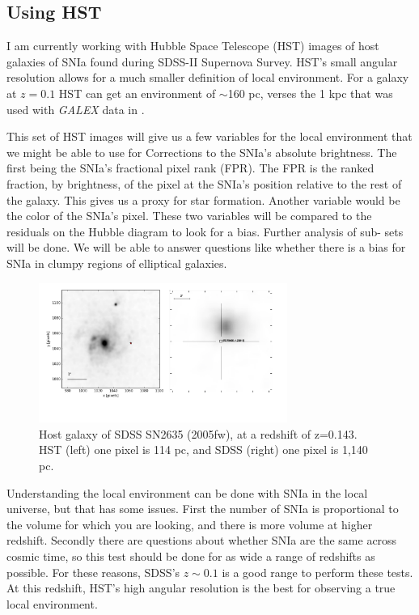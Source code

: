 \documentclass[apj, iop]{emulateapj}
\newcommand{\sn}{SNIa}
\begin{document}
\subsection{Using HST}\label{using-hst}

I am currently working with Hubble Space Telescope (HST) images of host galaxies
of \sn{} found during SDSS-II Supernova Survey. HST's small angular resolution
allows for a much smaller definition of local environment. For a galaxy at $z =
0.1$ HST can get an environment of $\sim$160 pc, verses the 1 kpc that was used 
with {\it GALEX} data in \cite{Jones15,Rigault15}.

This set of HST images will give us a few variables for the local environment
that we might be able to use for Corrections to the SNIa's absolute brightness.
The first being the SNIa's fractional pixel rank (FPR). The FPR is the ranked
fraction, by brightness, of the pixel at the SNIa's position relative to the
rest of the galaxy. This gives us a proxy for star formation. Another variable
would be the color of the SNIa's pixel. These two variables will be compared to
the residuals on the Hubble diagram to look for a bias. Further analysis of sub-
sets will be done. We will be able to answer questions like whether there is a
bias for \sn{} in clumpy regions of elliptical galaxies.

\begin{figure}
	\includegraphics[width=3.2in]{SN2635-combined-inverted.pdf}
	\caption{Host galaxy of SDSS SN2635 (2005fw), at a redshift of z=0.143. HST 
	(left) one pixel is 114 pc, and SDSS (right) one pixel is 1,140 pc.}
	\label{f:galaxy-compare}
\end{figure}

Understanding the local environment can be done with \sn{} in the local universe,
but that has some issues. First the number of \sn{} is proportional to the volume
for which you are looking, and there is more volume at higher redshift. Secondly
there are questions about whether \sn{} are the same across cosmic time, so this
test should be done for as wide a range of redshifts as possible. For these
reasons, SDSS's $z \sim 0.1$ is a good range to perform these tests. At this
redshift, HST's high angular resolution is the best for observing a true local
environment.
\end{document}
